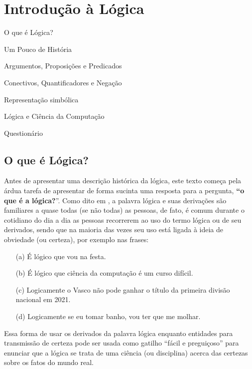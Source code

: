 \chapter{Introdução à Lógica}\label{cap:IntroducaoLogica}

\begin{introduction}[Tópicos]
	\item O que é Lógica?
	\item Um Pouco de História
	\item Argumentos, Proposições e Predicados
	\item Conectivos, Quantificadores e Negação
	\item Representação simbólica
	\item Lógica e Ciência da Computação
	\item Questionário
\end{introduction}

\section{O que é Lógica?}\label{sec:O-que-e-Logica}

Antes de apresentar uma descrição histórica da lógica, este texto começa pela árdua tarefa de apresentar de forma sucinta uma resposta para a pergunta, \textbf{``o que é a lógica?}''. Como dito em \cite{BenjaV1, copi1981}, a palavra lógica e suas derivações são familiares a quase todas (se não todas) as pessoas, de fato, é comum durante o cotidiano do dia a dia as pessoas recorrerem ao uso do termo lógica ou de seu derivados, sendo que na maioria das vezes seu uso está ligada à ideia de obviedade (ou certeza), por exemplo nas frases:

\begin{itemize}
    \item[(a)] É lógico que vou na festa.
    \item[(b)] É lógico que ciência da computação é um curso difícil.
    \item[(c)] Logicamente o Vasco não pode ganhar o título da primeira divisão nacional em 2021.
    \item[(d)] Logicamente se eu tomar banho, vou ter que me molhar.
\end{itemize}

Essa forma de usar os derivados da palavra lógica enquanto entidades para transmissão de certeza pode ser usada como gatilho ``fácil e preguiçoso'' para enunciar que a lógica se trata de uma ciência (ou disciplina) acerca das certezas sobre os fatos do mundo real. 

